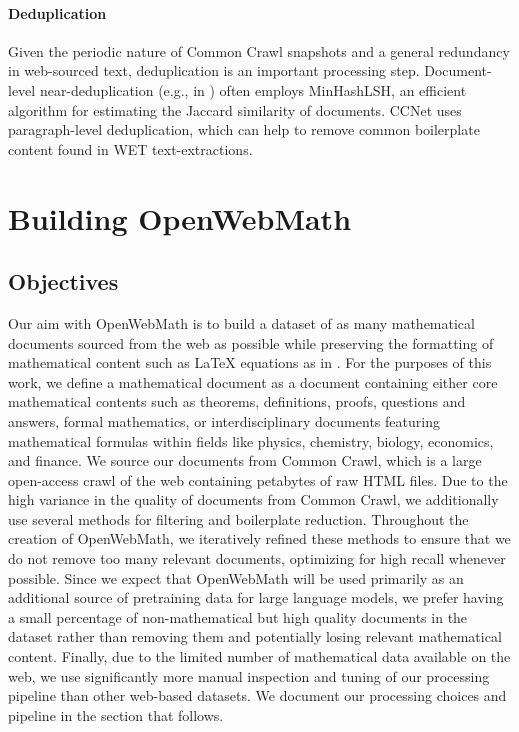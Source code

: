 \paragraph{Deduplication} Given the periodic nature of Common Crawl snapshots and a general redundancy in web-sourced text, deduplication is an important processing step. Document-level near-deduplication (e.g., in \citep{gpt3, refined-web}) often employs MinHashLSH, an efficient algorithm for estimating the Jaccard similarity of documents. CCNet \citep{wenzek2019ccnet} uses paragraph-level deduplication, which can help to remove common boilerplate content found in WET text-extractions.\section{Building OpenWebMath}

\subsection{Objectives}

Our aim with OpenWebMath is to build a dataset of as many mathematical documents sourced from the web as possible while preserving the formatting of mathematical content such as \LaTeX{} equations as in \citet{lewkowycz2022solving}. For the purposes of this work, we define a mathematical document as a document containing either core mathematical contents such as theorems, definitions, proofs, questions and answers, formal mathematics, or interdisciplinary documents featuring mathematical formulas within fields like physics, chemistry, biology, economics, and finance. We source our documents from Common Crawl, which is a large open-access crawl of the web containing petabytes of raw HTML files. Due to the high variance in the quality of documents from Common Crawl, we additionally use several methods for filtering and boilerplate reduction. Throughout the creation of OpenWebMath, we iteratively refined these methods to ensure that we do not remove too many relevant documents, optimizing for high recall whenever possible. Since we expect that OpenWebMath will be used primarily as an additional source of pretraining data for large language models, we prefer having a small percentage of non-mathematical but high quality documents in the dataset rather than removing them and potentially losing relevant mathematical content. Finally, due to the limited number of mathematical data available on the web, we use significantly more manual inspection and tuning of our processing pipeline than other web-based datasets. We document our processing choices and pipeline in the section that follows.

